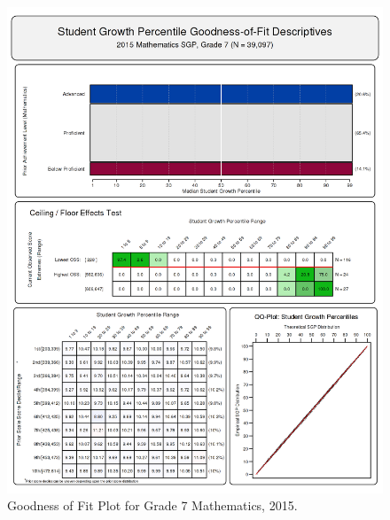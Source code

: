 \documentclass[12pt]{article}
\begin{document}
\begin{figure}[htbp]
\centering
\includegraphics{../img/Goodness_of_Fit/MATHEMATICS.2015/2015_MATH_7;2014_MATH_6;2013_MATH_5;2012_MATH_4;2011_MATH_3.png}
\caption{Goodness of Fit Plot for Grade 7 Mathematics, 2015.}
\end{figure}
\end{document}
